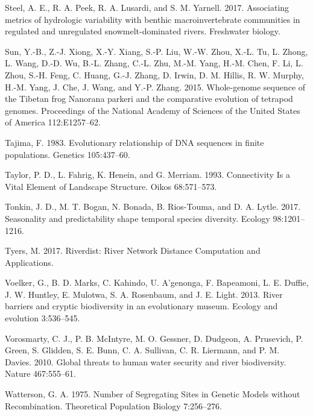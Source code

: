 \documentclass[twoside,12pt,final]{ucthesis-CA2012} %
\begin{document}
\begin{ucmainmatter}
\leavevmode\hypertarget{ref-steel_associating_2017}{}%
Steel, A. E., R. A. Peek, R. A. Lusardi, and S. M. Yarnell. 2017.
Associating metrics of hydrologic variability with benthic
macroinvertebrate communities in regulated and unregulated
snowmelt-dominated rivers. Freshwater biology.

\leavevmode\hypertarget{ref-sun_whole-genome_2015}{}%
Sun, Y.-B., Z.-J. Xiong, X.-Y. Xiang, S.-P. Liu, W.-W. Zhou, X.-L. Tu,
L. Zhong, L. Wang, D.-D. Wu, B.-L. Zhang, C.-L. Zhu, M.-M. Yang, H.-M.
Chen, F. Li, L. Zhou, S.-H. Feng, C. Huang, G.-J. Zhang, D. Irwin, D. M.
Hillis, R. W. Murphy, H.-M. Yang, J. Che, J. Wang, and Y.-P. Zhang.
2015. Whole-genome sequence of the Tibetan frog Nanorana parkeri and the
comparative evolution of tetrapod genomes. Proceedings of the National
Academy of Sciences of the United States of America 112:E1257--62.

\leavevmode\hypertarget{ref-tajima_evolutionary_1983}{}%
Tajima, F. 1983. Evolutionary relationship of DNA sequences in finite
populations. Genetics 105:437--60.

\leavevmode\hypertarget{ref-taylor_connectivity_1993}{}%
Taylor, P. D., L. Fahrig, K. Henein, and G. Merriam. 1993. Connectivity
Is a Vital Element of Landscape Structure. Oikos 68:571--573.

\leavevmode\hypertarget{ref-tonkin_seasonality_2017}{}%
Tonkin, J. D., M. T. Bogan, N. Bonada, B. Rios-Touma, and D. A. Lytle.
2017. Seasonality and predictability shape temporal species diversity.
Ecology 98:1201--1216.

\leavevmode\hypertarget{ref-tyers_riverdist_2017}{}%
Tyers, M. 2017. Riverdist: River Network Distance Computation and
Applications.

\leavevmode\hypertarget{ref-voelker_river_2013}{}%
Voelker, G., B. D. Marks, C. Kahindo, U. A'genonga, F. Bapeamoni, L. E.
Duffie, J. W. Huntley, E. Mulotwa, S. A. Rosenbaum, and J. E. Light.
2013. River barriers and cryptic biodiversity in an evolutionary museum.
Ecology and evolution 3:536--545.

\leavevmode\hypertarget{ref-vorosmarty_global_2010}{}%
Vorosmarty, C. J., P. B. McIntyre, M. O. Gessner, D. Dudgeon, A.
Prusevich, P. Green, S. Glidden, S. E. Bunn, C. A. Sullivan, C. R.
Liermann, and P. M. Davies. 2010. Global threats to human water security
and river biodiversity. Nature 467:555--61.

\leavevmode\hypertarget{ref-watterson_number_1975}{}%
Watterson, G. A. 1975. Number of Segregating Sites in Genetic Models
without Recombination. Theoretical Population Biology 7:256--276.


\end{ucmainmatter}
\end{document}
